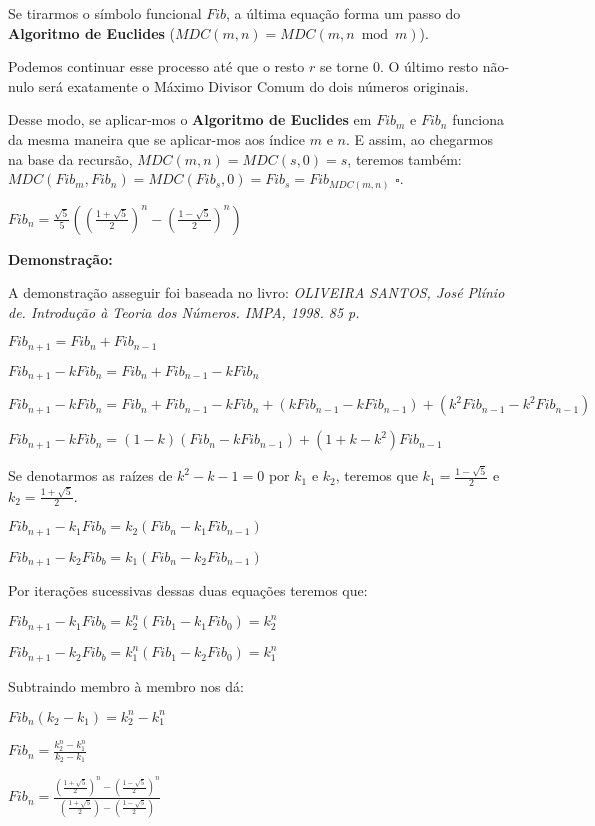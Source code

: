 Se tirarmos o símbolo funcional $Fib$, a última equação forma um passo do \textbf{Algoritmo de Euclides} ($MDC(m,n) = MDC(m, n \bmod m)$).

Podemos continuar esse processo até que o resto $r$ se torne $0$. O último resto não-nulo será
exatamente o Máximo Divisor Comum do dois números originais.

Desse modo, se aplicar-mos o \textbf{Algoritmo de Euclides} em $Fib_m$ e $Fib_n$ funciona da mesma maneira que se aplicar-mos aos índice $m$ e $n$.
E assim, ao chegarmos na base da recursão, $MDC(m,n) = MDC(s,0) = s$, teremos também: $MDC(Fib_m,Fib_n) = MDC(Fib_s,0) = Fib_s = Fib_{MDC(m,n)}$ $\square$.


\begin{theorem}
$Fib_n = \frac{\sqrt{5}}{5}((\frac{1+\sqrt{5}}{2})^n - (\frac{1-\sqrt{5}}{2})^n)$
\end{theorem}
\textbf{Demonstração:}

A demonstração asseguir foi baseada no livro: \textit{OLIVEIRA SANTOS, José Plínio de. Introdução à Teoria dos Números. IMPA, 1998. 85 p.}

$Fib_{n+1} = Fib_n + Fib_{n-1}$

$Fib_{n+1} - kFib_n = Fib_n + Fib_{n-1} - kFib_n$

$Fib_{n+1} - kFib_n = Fib_n + Fib_{n-1} - kFib_n + (kFib_{n-1}-kFib_{n-1}) + (k^2Fib_{n-1}-k^2Fib_{n-1})$

$Fib_{n+1} - kFib_n = (1 - k)(Fib_n - kFib_{n-1}) + (1 + k - k^2)Fib_{n-1}$

Se denotarmos as raízes de $k^2-k-1=0$ por $k_1$ e $k_2$, teremos que $k_1=\frac{1-\sqrt{5}}{2}$ e $k_2=\frac{1+\sqrt{5}}{2}$. 

$Fib_{n+1} - k_1Fib_b = k_2(Fib_n - k_1Fib_{n-1})$

$Fib_{n+1} - k_2Fib_b = k_1(Fib_n - k_2Fib_{n-1})$

Por iterações sucessivas dessas duas equações teremos que:

$Fib_{n+1} - k_1Fib_b = k_2^n(Fib_1 - k_1Fib_0) = k_2^n$

$Fib_{n+1} - k_2Fib_b = k_1^n(Fib_1 - k_2Fib_0) = k_1^n$

Subtraindo membro à membro nos dá:

$Fib_n(k_2 - k_1) = k_2^n - k_1^n$

$Fib_n = \frac{k_2^n - k_1^n}{k_2 - k_1}$

$Fib_n = \frac{(\frac{1+\sqrt{5}}{2})^n - (\frac{1-\sqrt{5}}{2})^n}{(\frac{1+\sqrt{5}}{2}) - (\frac{1-\sqrt{5}}{2})}$

